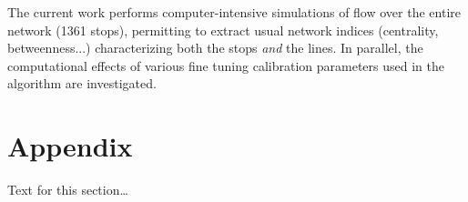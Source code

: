 \documentclass{bmcart}
\begin{document}
\vspace*{0.2cm}

The current work performs computer-intensive simulations of flow over the entire network (1361 stops), permitting to extract usual network indices (centrality, betweenness...) characterizing both the stops \emph{and} the lines. In parallel, the computational effects of various fine tuning calibration parameters used in the algorithm are investigated. 





\section*{Appendix}
Text for this section\ldots

\end{document}

